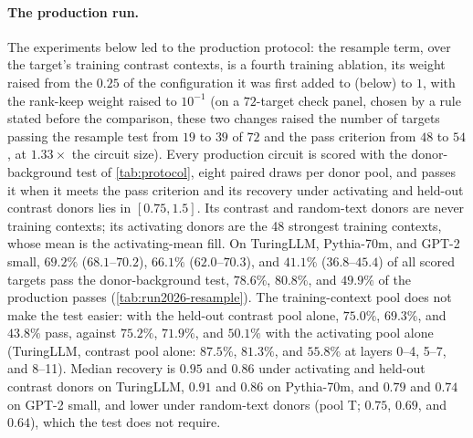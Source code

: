 \documentclass[10pt]{article}
\begin{document}
\paragraph{The production run.}
The experiments below led to the production protocol: the resample term, over the target's training contrast contexts, is a fourth training ablation, its weight raised from the $0.25$ of the configuration it was first added to (below) to $1$, with the rank-keep weight raised to $10^{-1}$ (on a $72$-target check panel, chosen by a rule stated before the comparison, these two changes raised the number of targets passing the resample test from $19$ to $39$ of $72$ and the pass criterion from $48$ to $54$, at $1.33\times$ the circuit size).
Every production circuit is scored with the donor-background test of \cref{tab:protocol}, eight paired draws per donor pool, and passes it when it meets the pass criterion and its recovery under activating and held-out contrast donors lies in $[0.75, 1.5]$.
Its contrast and random-text donors are never training contexts; its activating donors are the 48 strongest training contexts, whose mean is the activating-mean fill.
On TuringLLM, Pythia-70m, and GPT-2 small, $69.2\%$ ($68.1$--$70.2$), $66.1\%$ ($62.0$--$70.3$), and $41.1\%$ ($36.8$--$45.4$) of all scored targets pass the donor-background test, $78.6\%$, $80.8\%$, and $49.9\%$ of the production passes (\cref{tab:run2026-resample}).
The training-context pool does not make the test easier: with the held-out contrast pool alone, $75.0\%$, $69.3\%$, and $43.8\%$ pass, against $75.2\%$, $71.9\%$, and $50.1\%$ with the activating pool alone (TuringLLM, contrast pool alone: $87.5\%$, $81.3\%$, and $55.8\%$ at layers 0--4, 5--7, and 8--11).
Median recovery is $0.95$ and $0.86$ under activating and held-out contrast donors on TuringLLM, $0.91$ and $0.86$ on Pythia-70m, and $0.79$ and $0.74$ on GPT-2 small, and lower under random-text donors (pool T; $0.75$, $0.69$, and $0.64$), which the test does not require.
\end{document}
